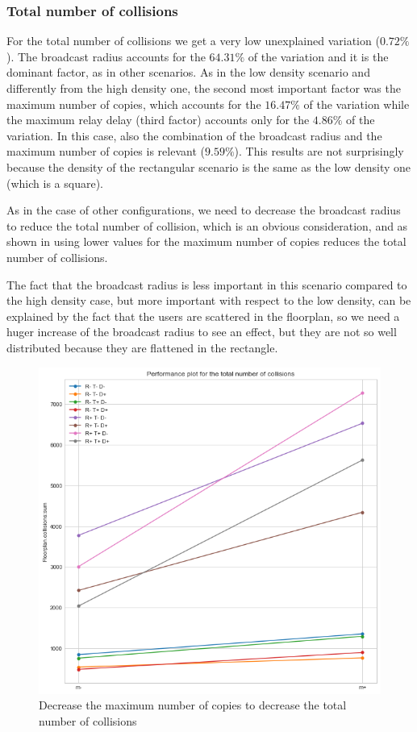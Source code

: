 \subsubsection{Total number of collisions}\label{subsubsec:rect2krcollisions}

For the total number of collisions we get a very low unexplained variation
(\(0.72\%\)). The broadcast radius accounts for the \(64.31\%\) of the variation
and it is the dominant factor, as in other scenarios. As in the low density
scenario and differently from the high density one, the second most important
factor was the maximum number of copies, which accounts for the \(16.47\%\) of
the variation while the maximum relay delay (third factor) accounts only for the
\(4.86\%\) of the variation. In this case, also the combination of the broadcast
radius and the maximum number of copies is relevant (\(9.59\%\)). This results
are not surprisingly because the density of the rectangular scenario is the same
as the low density one (which is a square).

As in the case of other configurations, we need to decrease the broadcast radius
to reduce the total number of collision, which is an obvious consideration, and
as shown in  using lower values for the maximum
number of copies reduces the total number of collisions.

The fact that the broadcast radius is less important in this scenario compared
to the high density case, but more important with respect to the low density,
can be explained by the fact that the users are scattered in the floorplan, so
we need a huger increase of the broadcast radius to see an effect, but they are
not so well distributed because they are flattened in the rectangle.

\begin{figure}[htb]
	\centering
	\includegraphics[width=\textwidth]{img/rect/collisions_m_perfplot.png}
	\caption{Decrease the maximum number of copies to decrease the total
	number of collisions}\label{fig:rectperfcollisionsm}
\end{figure}
